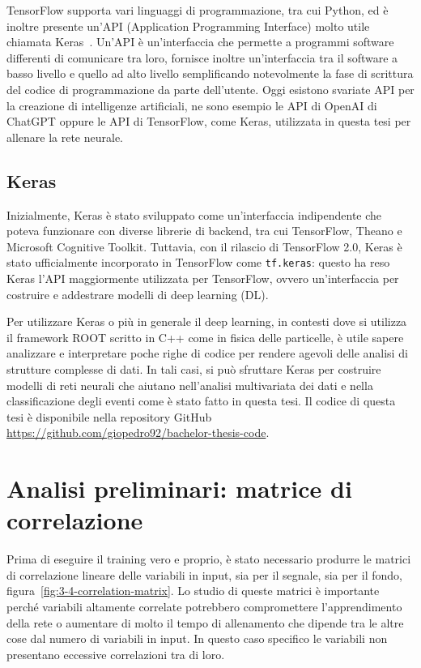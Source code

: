         TensorFlow supporta vari linguaggi di programmazione, tra cui Python, ed è inoltre presente un’API (Application Programming Interface) molto utile chiamata Keras~\cite{Keras}. Un’API è un’interfaccia che permette a programmi software differenti di comunicare tra loro, fornisce inoltre un’interfaccia tra il software a basso livello e quello ad alto livello semplificando notevolmente la fase di scrittura del codice di programmazione da parte dell’utente. Oggi esistono svariate API per la creazione di intelligenze artificiali, ne sono esempio le API di OpenAI di ChatGPT oppure le API di TensorFlow, come Keras, utilizzata in questa tesi per allenare la rete neurale.

    \subsection{Keras}
        Inizialmente, Keras è stato sviluppato come un’interfaccia indipendente che poteva funzionare con diverse librerie di backend, tra cui TensorFlow, Theano e Microsoft Cognitive Toolkit. Tuttavia, con il rilascio di TensorFlow 2.0, Keras è stato ufficialmente incorporato in TensorFlow come \texttt{tf.keras}: questo ha reso Keras l’API maggiormente utilizzata per TensorFlow, ovvero un’interfaccia per costruire e addestrare modelli di deep learning (DL).

        Per utilizzare Keras o più in generale il deep learning, in contesti dove si utilizza il framework ROOT scritto in C++ come in fisica delle particelle, è utile sapere analizzare e interpretare poche righe di codice per rendere agevoli delle analisi di strutture complesse di dati. In tali casi, si può sfruttare Keras per costruire modelli di reti neurali che aiutano nell’analisi multivariata dei dati e nella classificazione degli eventi come è stato fatto in questa tesi. Il codice di questa tesi è disponibile nella repository GitHub \url{https://github.com/giopedro92/bachelor-thesis-code}.

\section{Analisi preliminari: matrice di correlazione}
    Prima di eseguire il training vero e proprio, è stato necessario produrre le matrici di correlazione lineare delle variabili in input, sia per il segnale, sia per il fondo, figura~\ref{fig:3-4-correlation-matrix}. Lo studio di queste matrici è importante perché variabili altamente correlate potrebbero compromettere l'apprendimento della rete o aumentare di molto il tempo di allenamento che dipende tra le altre cose dal numero di variabili in input. In questo caso specifico le variabili non presentano eccessive correlazioni tra di loro.

